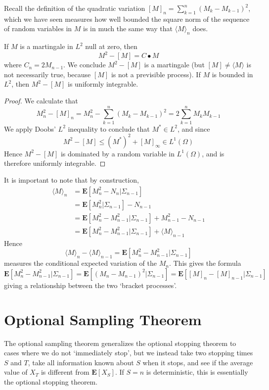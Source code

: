 Recall the definition of the quadratic variation $[M]_n = \sum_{k = 1}^n (M_k - M_{k-1})^2$, which we have seen measures how well bounded the square norm of the sequence of random variables in $M$ is in much the same way that $\langle M \rangle_n$ does.

\begin{theorem}
    If $M$ is a martingale in $L^2$ null at zero, then
    \[ M^2 - [M] = C \bullet M \]
    where $C_n = 2M_{n-1}$. We conclude $M^2 - [M]$ is a martingale (but $[M] \neq \langle M \rangle$ is not necessarily true, because $[M]$ is not a previsible process). If $M$ is bounded in $L^2$, then $M^2 - [M]$ is uniformly integrable.
\end{theorem}
\begin{proof}
    We calculate that
    \[ M^2_n - [M]_n = M_n^2 - \sum_{k = 1}^n (M_k - M_{k-1})^2 = 2 \sum_{k = 1}^n M_k M_{k-1} \]
    We apply Doobs' $L^2$ inequality to conclude that $M^* \in L^2$, and since
    \[ M^2 - [M] \leq (M^*)^2 + [M]_\infty \in L^1(\Omega) \]
    Hence $M^2 - [M]$ is dominated by a random variable in $L^1(\Omega)$, and is therefore uniformly integrable.
\end{proof}

It is important to note that by construction,
    \begin{align*}
        \langle M \rangle_n &= \mathbf{E}[M_n^2 - N_n|\Sigma_{n-1}]\\
        &= \mathbf{E}[M_n^2|\Sigma_{n-1}] - N_{n-1}\\
        &= \mathbf{E}[M_n^2 - M_{n-1}^2|\Sigma_{n-1}] + M_{n-1}^2 - N_{n-1}\\
        &= \mathbf{E}[M_n^2 - M_{n-1}^2|\Sigma_{n-1}] + \langle M \rangle_{n-1}
    \end{align*}
    Hence
    \[ \langle M \rangle_n - \langle M \rangle_{n-1} = \mathbf{E}[M_n^2 - M_{n-1}^2|\Sigma_{n-1}] \]
    measures the conditional expected variation of the $M_n$. This gives the formula
    \[ \mathbf{E}[M_n^2 - M_{n-1}^2|\Sigma_{n-1}] = \mathbf{E}[(M_n - M_{n-1})^2|\Sigma_{n-1}] = \mathbf{E}[[M]_n - [M]_{n-1}|\Sigma_{n-1}] \]
    giving a relationship between the two `bracket processes'.

\section{Optional Sampling Theorem}

The optional sampling theorem generalizes the optional stopping theorem to cases where we do not `immediately stop', but we instead take two stopping times $S$ and $T$, take all information known about $S$ when it stops, and see if the average value of $X_T$ is different from $\mathbf{E}[X_S]$. If $S = n$ is deterministic, this is essentially the optional stopping theorem.

